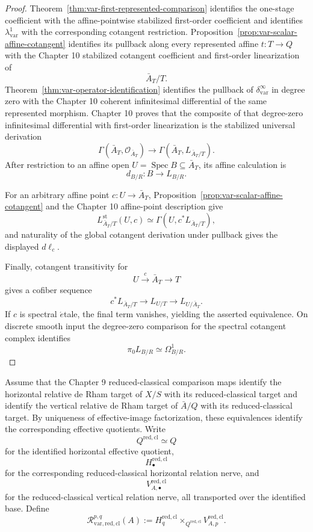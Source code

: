 \begin{proof}
Theorem~\ref{thm:var-first-represented-comparison} identifies the one-stage coefficient with the affine-pointwise stabilized first-order coefficient and identifies \(\lambda^1_{\mathrm{var}}\) with the corresponding cotangent restriction. Proposition~\ref{prop:var-scalar-affine-cotangent} identifies its pullback along every represented affine \(t:T\to Q\) with the Chapter 10 stabilized cotangent coefficient and first-order linearization of
\[
    \bar A_T/T.
\]
Theorem~\ref{thm:var-operator-identification} identifies the pullback of \(\delta^\infty_{\mathrm{var}}\) in degree zero with the Chapter 10 coherent infinitesimal differential of the same represented morphism. Chapter 10 proves that the composite of that degree-zero infinitesimal differential with first-order linearization is the stabilized universal derivation
\[
    \Gamma(\bar A_T,\mathcal O_{\bar A_T})
    \longrightarrow
    \Gamma(\bar A_T,L_{\bar A_T/T}).
\]
After restriction to an affine open \(U=\operatorname{Spec}B\subseteq\bar A_T\), its affine calculation is
\[
    d_{B/R}:B\longrightarrow L_{B/R}.
\]

For an arbitrary affine point \(c:U\to\bar A_T\), Proposition~\ref{prop:var-scalar-affine-cotangent} and the Chapter 10 affine-point description give
\[
    L^{\mathrm{st}}_{\bar A_T/T}(U,c)
    \simeq
    \Gamma(U,c^*L_{\bar A_T/T}),
\]
and naturality of the global cotangent derivation under pullback gives the displayed \(d\ell_c\).

Finally, cotangent transitivity for
\[
    U\xrightarrow{c}\bar A_T\longrightarrow T
\]
gives a cofiber sequence
\[
    c^*L_{\bar A_T/T}
    \longrightarrow
    L_{U/T}
    \longrightarrow
    L_{U/\bar A_T}.
\]
If \(c\) is spectral \(\acute{e}\)tale, the final term vanishes, yielding the asserted equivalence.  On discrete smooth input the degree-zero comparison for the spectral cotangent complex identifies
\[
    \pi_0L_{B/R}
    \simeq
    \Omega^1_{B/R}.
\]
\end{proof}

\begin{definition}
\label{def:var-reduced-classical-double}
Assume that the Chapter 9 reduced-classical comparison maps identify the horizontal relative de Rham target of \(X/S\) with its reduced-classical target and identify the vertical relative de Rham target of \(\bar A/Q\) with its reduced-classical target. By uniqueness of effective-image factorization, these equivalences identify the corresponding effective quotients. Write
\[
    Q^{\mathrm{red,cl}}\simeq Q
\]
for the identified horizontal effective quotient,
\[
    H^{\mathrm{red,cl}}_\bullet
\]
for the corresponding reduced-classical horizontal relation nerve, and
\[
    V^{\mathrm{red,cl}}_{A,\bullet}
\]
for the reduced-classical vertical relation nerve, all transported over the identified base. Define
\[
    \boxed{
    \mathcal R_{\mathrm{var,red,cl}}^{p,q}(A)
    :=
    H_q^{\mathrm{red,cl}}
    \times_{Q^{\mathrm{red,cl}}}
    V_{A,p}^{\mathrm{red,cl}}.
    }
\]
\end{definition}

